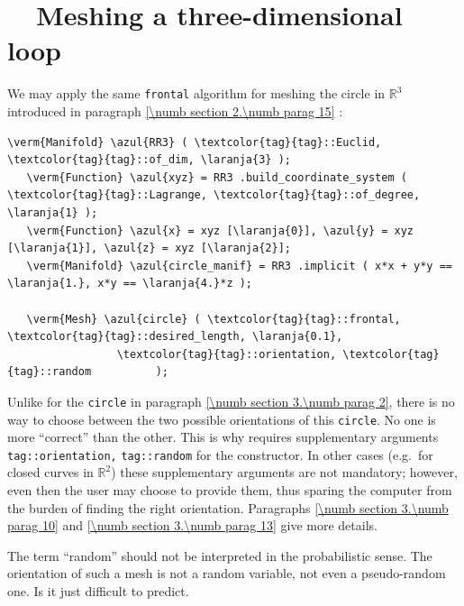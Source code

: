 \section{~~Meshing a three-dimensional loop}\label{\numb section 3.\numb parag 4}

We may apply the same {\small\tt frontal} algorithm for meshing the circle in
$ \mathbb{R}^3 $ introduced in paragraph \ref{\numb section 2.\numb parag 15} :

\begin{Verbatim}[commandchars=\\\{\},formatcom=\small\tt,frame=single,
   label=parag-\ref{\numb section 3.\numb parag 4}.cpp,rulecolor=\color{moldura},
   baselinestretch=0.94,framesep=2mm                                            ]
   \verm{Manifold} \azul{RR3} ( \textcolor{tag}{tag}::Euclid, \textcolor{tag}{tag}::of_dim, \laranja{3} );
   \verm{Function} \azul{xyz} = RR3 .build_coordinate_system ( \textcolor{tag}{tag}::Lagrange, \textcolor{tag}{tag}::of_degree, \laranja{1} );
   \verm{Function} \azul{x} = xyz [\laranja{0}], \azul{y} = xyz [\laranja{1}], \azul{z} = xyz [\laranja{2}];
   \verm{Manifold} \azul{circle_manif} = RR3 .implicit ( x*x + y*y == \laranja{1.}, x*y == \laranja{4.}*z );
   
   \verm{Mesh} \azul{circle} ( \textcolor{tag}{tag}::frontal, \textcolor{tag}{tag}::desired_length, \laranja{0.1},
                 \textcolor{tag}{tag}::orientation, \textcolor{tag}{tag}::random          );
\end{Verbatim}

Unlike for the {\small\tt circle} in paragraph \ref{\numb section 3.\numb parag 2},
there is no way to choose between the two possible orientations of this {\small\tt circle}.
No one is more ``correct'' than the other.
This is why {\maniFEM} requires supplementary arguments
{\small\tt\textcolor{tag}{tag}::orientation,} {\small\tt\textcolor{tag}{tag}::random}
for the {\small\tt{}} constructor.
In other cases (e.g.\ for closed curves in $ \mathbb{R}^2 $) these supplementary arguments
are not mandatory; however, even then the user may choose to provide them,
thus sparing the computer from the burden of finding the right orientation.
Paragraphs \ref{\numb section 3.\numb parag 10} and \ref{\numb section 3.\numb parag 13}
give more details.

The term ``random'' should not be interpreted in the probabilistic sense.
The orientation of such a mesh is not a random variable, not even a pseudo-random one.
Is it just difficult to predict.

